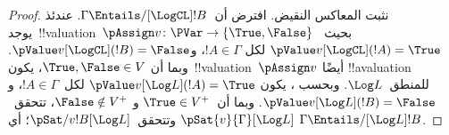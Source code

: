 \documentclass[../../../include/open-logic-section]{subfiles}
\begin{document}
\begin{proof}
  نثبت المعاكس النقيض. افترض أن~$\Gamma \Entails/[\LogCL] !B$.
  عندئذ يوجد~!!{valuation}~$\pAssign v\colon \PVar \to
  \{\True, \False\}$ بحيث~$\pValue v[\LogCL](!A) = \True$ لكل
  $!A \in \Gamma$، و$\pValue v[\LogCL](!B) = \False$. وبما أن
  $\True, \False \in V$، يكون~!!{valuation}~$\pAssign v$ أيضًا
  !!a{valuation} للمنطق~$\Log L$. وبحسب ، يكون
  $\pValue v[\Log L](!A) = \True$ لكل~$!A \in \Gamma$، و
  $\pValue v[\Log L](!B) = \False$. وبما أن~$\True \in V^+$ و
  $\False \notin V^+$، تتحقق~$\pSat{v}{\Gamma}[\Log L]$
  وتتحقق~$\pSat/{v}{!B}[\Log L]$؛ أي
  $\Gamma \Entails/[\Log L] !B$.
\end{proof}
\end{document}
